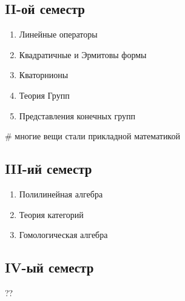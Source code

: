 \documentclass{book}
\begin{document}
\subsection{II-ой семестр}
\begin{enumerate}
    \item Линейные операторы
    \item Квадратичные и Эрмитовы формы
    \item Кваторнионы
    \item Теория Групп
    \item Представления конечных групп
\end{enumerate}
\# многие вещи стали прикладной математикой
\subsection{III-ий семестр}
\begin{enumerate}
    \item Полилинейная алгебра
    \item Теория категорий
    \item Гомологическая алгебра
\end{enumerate}
\subsection{IV-ый семестр}
??


\end{document}
